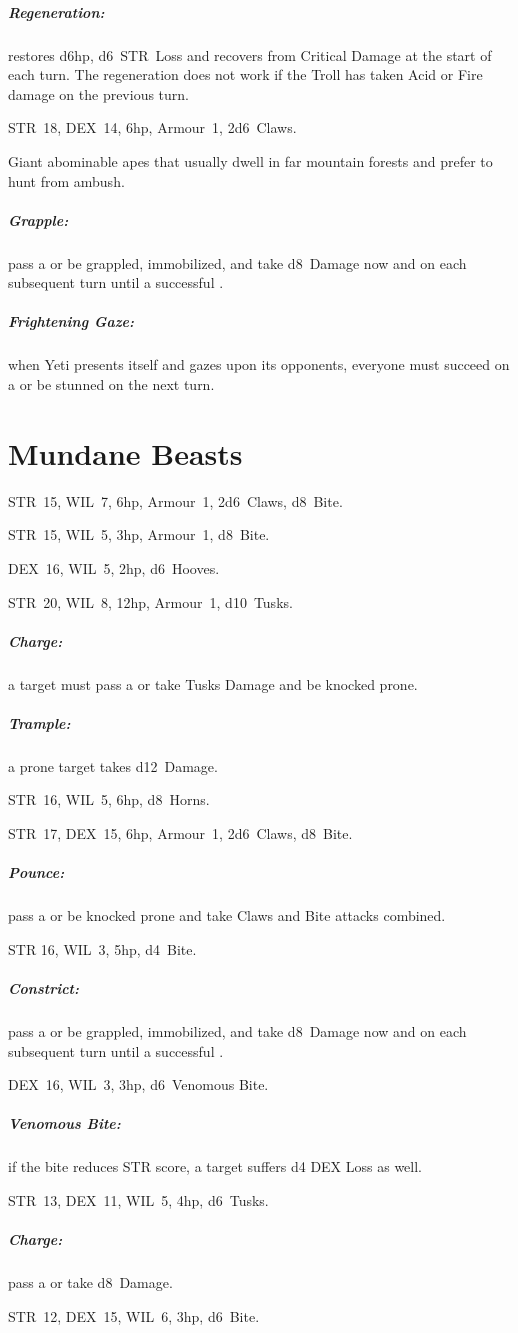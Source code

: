 \documentclass[itdr]{subfiles}
\begin{document}
\subparagraph{Regeneration:} restores d6hp, d6~STR~Loss and recovers from Critical Damage at the start of each turn. The regeneration does not work if the Troll has taken Acid or Fire damage on the previous turn.

\vfill

STR~18, DEX~14, 6hp, Armour~1, 2d6~Claws.

Giant abominable apes that usually dwell in far mountain forests and prefer to hunt from ambush.

\subparagraph{Grapple:} pass a  or be grappled, immobilized, and take d8~Damage now and on each subsequent turn until a successful .

\subparagraph{Frightening Gaze:} when Yeti presents itself and gazes upon its opponents, everyone must succeed on a  or be stunned on the next turn.

\vfill
\break

\section{Mundane Beasts}

STR~15, WIL~7, 6hp, Armour~1, 2d6~Claws, d8~Bite.

\vfill

STR~15, WIL~5, 3hp, Armour~1, d8~Bite.

\vfill

DEX~16, WIL~5, 2hp, d6~Hooves.

\vfill

STR~20, WIL~8, 12hp, Armour~1, d10~Tusks.
\subparagraph{Charge:} a target must pass a  or take Tusks Damage and be knocked prone.
\subparagraph{Trample:} a prone target takes d12~Damage.

\vfill

STR~16, WIL~5, 6hp, d8~Horns.

\vfill

STR~17, DEX~15, 6hp, Armour~1, 2d6~Claws, d8~Bite.
\subparagraph{Pounce:} pass a  or be knocked prone and take Claws and Bite attacks combined.

\vfill

STR 16, WIL~3, 5hp, d4~Bite.
\subparagraph{Constrict:} pass a  or be grappled, immobilized, and take d8~Damage now and on each subsequent turn until a successful .

\vfill

DEX~16, WIL~3, 3hp, d6~Venomous Bite.
\subparagraph{Venomous Bite:} if the bite reduces STR score, a target suffers d4 DEX Loss as well.

\vfill

STR~13, DEX~11, WIL~5, 4hp, d6~Tusks.
\subparagraph{Charge:} pass a  or take d8~Damage.

\vfill

STR~12, DEX~15, WIL~6, 3hp, d6~Bite.

\vfill
~
\end{document}
